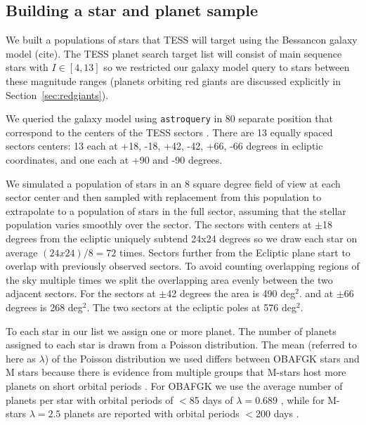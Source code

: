 \documentclass[iop,apj]{emulateapj}
\begin{document}
\subsection{Building a star and planet sample}
We built a populations of stars that TESS will target using the Bessancon galaxy model (cite). The TESS planet search target list will consist of main sequence stars with $I\in\left[4,13\right]$ \citep{ricker14} so we restricted our galaxy model query to stars between these magnitude ranges (planets orbiting red giants are discussed explicitly in Section~\ref{sec:redgiants}).

We queried the galaxy model using \texttt{astroquery} in 80 separate position that correspond to the centers of the TESS sectors \citep[cf. Figure 7 in ][]{ricker14}. There are 13 equally spaced sectors centers: 13 each at +18, -18, +42, -42, +66, -66 degrees in ecliptic coordinates, and one each at +90 and -90 degrees. 

We simulated a population of stars in an 8 square degree field of view at each sector center and then sampled with replacement from this population to extrapolate to a population of stars in the full sector, assuming that the stellar population varies smoothly over the sector. The sectors with centers at $\pm$18 degrees from the ecliptic uniquely subtend 24x24 degrees so we draw each star on average $(24x24)/8=72$ times. Sectors further from the Ecliptic plane start to overlap with previously observed sectors. To avoid counting overlapping regions of the sky multiple times we split the overlapping area evenly between the two adjacent sectors. For the sectors at $\pm$42 degrees the area is 490 deg$^2$. and at $\pm$66 degrees is 268 deg$^2$. The two sectors at the ecliptic poles at 576 deg$^2$.

To each star in our list we assign one or more planet. The number of planets assigned to each star is drawn from a Poisson distribution. The mean (referred to here as $\lambda$) of the Poisson distribution we used differs between OBAFGK stars and M stars because there is evidence from multiple groups that M-stars host more planets on short orbital periods \citep{threecitations,burke15}. For OBAFGK we use the average number of planets per star with orbital periods of $<$85 days of $\lambda=0.689$ \citep{fressin13}, while for M-stars $\lambda=2.5$ planets are reported with orbital periods $<$200 days \citep{dressin15}. 
\end{document}
